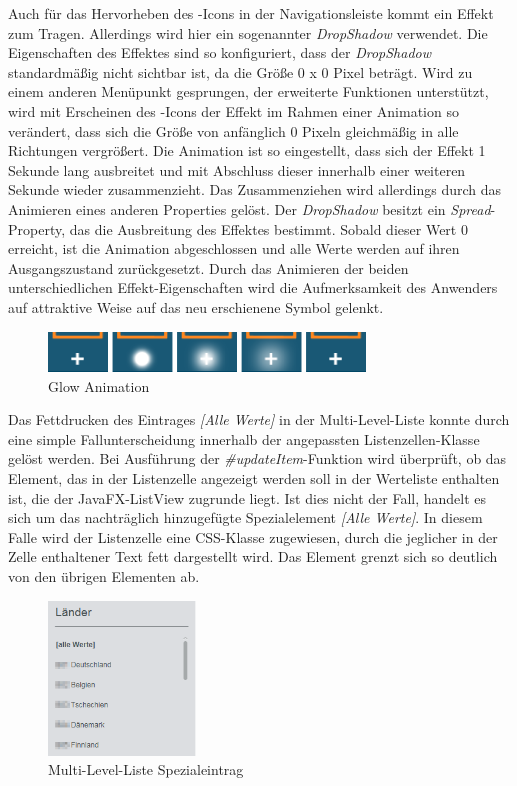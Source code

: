 Auch für das Hervorheben des -Icons in der Navigationsleiste kommt ein Effekt zum Tragen. Allerdings wird hier ein sogenannter \textit{DropShadow} verwendet. Die Eigenschaften des Effektes sind so konfiguriert, dass der \textit{DropShadow} standardmäßig nicht sichtbar ist, da die Größe 0 x 0 Pixel beträgt. Wird zu einem anderen Menüpunkt gesprungen, der erweiterte Funktionen unterstützt, wird mit Erscheinen des -Icons der Effekt im Rahmen einer Animation so verändert, dass sich die Größe von anfänglich 0 Pixeln gleichmäßig in alle Richtungen vergrößert. Die Animation ist so eingestellt, dass sich der Effekt 1 Sekunde lang ausbreitet und mit Abschluss dieser innerhalb einer weiteren Sekunde wieder zusammenzieht. Das Zusammenziehen wird allerdings durch das Animieren eines anderen Properties gelöst. Der \textit{DropShadow} besitzt ein \textit{Spread}- Property, das die Ausbreitung des Effektes bestimmt. Sobald dieser Wert 0 erreicht, ist die Animation abgeschlossen und alle Werte werden auf ihren Ausgangszustand zurückgesetzt. Durch das Animieren der beiden unterschiedlichen Effekt-Eigenschaften wird die Aufmerksamkeit des Anwenders auf attraktive Weise auf das neu erschienene Symbol gelenkt.\par
\begin{figure}[H]
 \centering
 \includegraphics[width=0.75\textwidth]{grafiken/glow_animation.png}
 \caption{Glow Animation}
 \label{fig:glowAnimation}
\end{figure}
Das Fettdrucken des Eintrages \textit{[Alle Werte]} in der Multi-Level-Liste konnte durch eine simple Fallunterscheidung innerhalb der angepassten Listenzellen-Klasse gelöst werden. Bei Ausführung der \textit{\#{}updateItem}-Funktion wird überprüft, ob das Element, das in der Listenzelle angezeigt werden soll in der Werteliste enthalten ist, die der JavaFX-ListView zugrunde liegt. Ist dies nicht der Fall, handelt es sich um das nachträglich hinzugefügte Spezialelement \textit{[Alle Werte]}. In diesem Falle wird der Listenzelle eine CSS-Klasse zugewiesen, durch die jeglicher in der Zelle enthaltener Text fett dargestellt wird. Das Element grenzt sich so deutlich von den übrigen Elementen ab.\par
\begin{figure}[H]
 \centering
 \includegraphics[width=0.35\textwidth]{grafiken/mll_Werte.png}
 \caption{Multi-Level-Liste Spezialeintrag}
 \label{fig:mllSpecialValue}
\end{figure}
